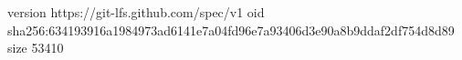 version https://git-lfs.github.com/spec/v1
oid sha256:634193916a1984973ad6141e7a04fd96e7a93406d3e90a8b9ddaf2df754d8d89
size 53410
